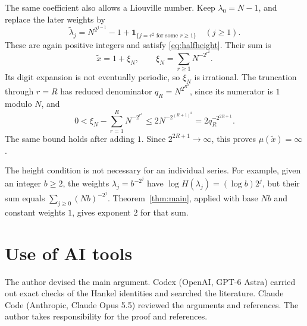 \documentclass{amsart}
\numberwithin{equation}{section}
\begin{document}
The same coefficient also allows a Liouville number. Keep $\lambda_0=N-1$, and replace the later weights by
\[
\widetilde\lambda_j=N^{2^{j-1}}-1+
\boldsymbol1_{\{j=r^2\text{ for some }r\ge1\}}\quad(j\ge1).
\]
These are again positive integers and satisfy \eqref{eq:halfheight}.
Their sum is
\[
\widetilde x=1+\xi_N,\qquad \xi_N=\sum_{r\ge1}N^{-2^{r^2}}.
\]
Its digit expansion is not eventually periodic, so $\xi_N$ is irrational.
The truncation through $r=R$ has reduced denominator
$q_R=N^{2^{R^2}}$, since its numerator is $1$ modulo $N$, and
\[
0<\xi_N-\sum_{r=1}^{R}N^{-2^{r^2}}
 \le2N^{-2^{(R+1)^2}}=2q_R^{-2^{2R+1}}.
\]
The same bound holds after adding $1$. Since $2^{2R+1}\to\infty$,
this proves $\mu(\widetilde x)=\infty$.

The height condition is not necessary for an individual series. For example, given an integer $b\ge2$,
the weights $\lambda_j=b^{-2^j}$ have
$\log H(\lambda_j)=(\log b)2^j$, but their sum equals
$\sum_{j\ge0}(Nb)^{-2^j}$. Theorem~\ref{thm:main}, applied with
base $Nb$ and constant weights $1$, gives exponent $2$ for that sum.


\section*{Use of AI tools}

The author devised the main argument. Codex (OpenAI, GPT-6 Astra) carried
out exact checks of the Hankel identities and searched the literature.
Claude Code (Anthropic, Claude Opus 5.5) reviewed the arguments and
references. The author takes responsibility for the proof and references.
\end{document}
